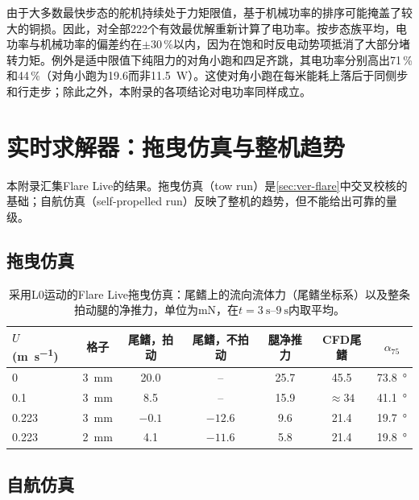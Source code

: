 由于大多数最快步态的舵机持续处于力矩限值，基于机械功率的排序可能掩盖了较大的铜损。因此，对全部222个有效最优解重新计算了电功率。按步态族平均，电功率与机械功率的偏差约在$\pm30$\,\%以内，因为在饱和时反电动势项抵消了大部分堵转力矩。例外是适中限值下纯阻力的对角小跑和四足齐跳，其电功率分别高出71\,\%和44\,\%（对角小跑为\SI{19.6}{}而非\SI{11.5}{\watt}）。这使对角小跑在每米能耗上落后于同侧步和行走步；除此之外，本附录的各项结论对电功率同样成立。

\chapter{实时求解器：拖曳仿真与整机趋势}
\label{app:flare-trends}

本附录汇集Flare Live的结果。拖曳仿真（tow run）是\cref{sec:ver-flare}中交叉校核的基础；自航仿真（self-propelled run）反映了整机的趋势，但不能给出可靠的量级。

\section{拖曳仿真}
\label{app:flare}

\begin{table}[H]
  \centering
  \caption[Flare Live拖曳仿真]{采用L0运动的Flare Live拖曳仿真：尾鳍上的流向流体力（尾鳍坐标系）以及整条拍动腿的净推力，单位为\si{\milli\newton}，在$t=\SIrange{3}{9}{\second}$内取平均。}
  \label{tab:app-flare}
  \footnotesize
  \begin{tabular}{@{}lcccccc@{}}
    \toprule
    $U$ (\si{\metre\per\second}) & 格子 & 尾鳍，拍动 & 尾鳍，不拍动 & 腿净推力 & CFD尾鳍 & $\alpha_{75}$ \\
    \midrule
    0     & \SI{3}{\milli\metre} & 20.0  & --      & 25.7 & 45.5 & \SI{73.8}{\degree} \\
    0.1   & \SI{3}{\milli\metre} & 8.5   & --      & 15.9 & $\approx34$ & \SI{41.1}{\degree} \\
    0.223 & \SI{3}{\milli\metre} & $-0.1$ & $-12.6$ & 9.6  & 21.4 & \SI{19.7}{\degree} \\
    0.223 & \SI{2}{\milli\metre} & 4.1   & $-11.6$ & 5.8  & 21.4 & \SI{19.8}{\degree} \\
    \bottomrule
  \end{tabular}
\end{table}

\section{自航仿真}

